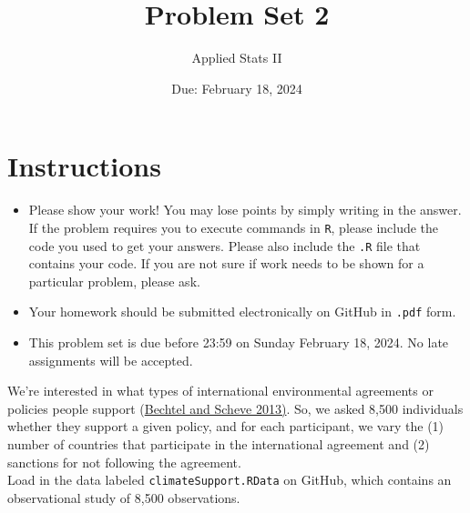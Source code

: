\documentclass[12pt,letterpaper]{article}
\title{Problem Set 2}
\date{Due: February 18, 2024}
\author{Applied Stats II}
\begin{document}
	\maketitle
	\section*{Instructions}
	\begin{itemize}
		\item Please show your work! You may lose points by simply writing in the answer. If the problem requires you to execute commands in \texttt{R}, please include the code you used to get your answers. Please also include the \texttt{.R} file that contains your code. If you are not sure if work needs to be shown for a particular problem, please ask.
		\item Your homework should be submitted electronically on GitHub in \texttt{.pdf} form.
		\item This problem set is due before 23:59 on Sunday February 18, 2024. No late assignments will be accepted.
	\end{itemize}

	
	

	\vspace{.25cm}
\noindent We're interested in what types of international environmental agreements or policies people support (\href{https://www.pnas.org/content/110/34/13763}{Bechtel and Scheve 2013)}. So, we asked 8,500 individuals whether they support a given policy, and for each participant, we vary the (1) number of countries that participate in the international agreement and (2) sanctions for not following the agreement. \\

\noindent Load in the data labeled \texttt{climateSupport.RData} on GitHub, which contains an observational study of 8,500 observations.
\end{document}

